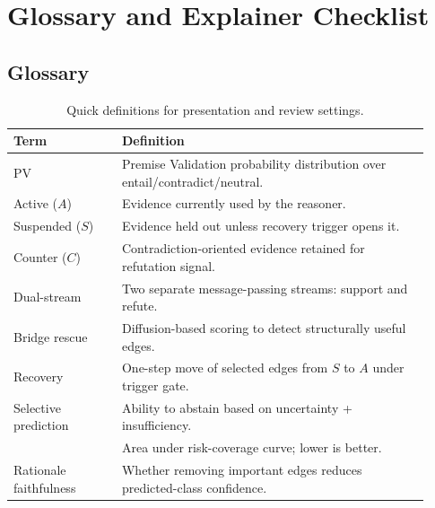 \section{Glossary and Explainer Checklist}
\label{sec:glossary}

\subsection{Glossary}
\begin{table}[H]
\centering
\begin{tabular}{@{}p{0.24\linewidth}p{0.68\linewidth}@{}}
\toprule
Term & Definition \\
\midrule
PV & Premise Validation probability distribution over entail/contradict/neutral. \\
Active ($A$) & Evidence currently used by the reasoner. \\
Suspended ($S$) & Evidence held out unless recovery trigger opens it. \\
Counter ($C$) & Contradiction-oriented evidence retained for refutation signal. \\
Dual-stream & Two separate message-passing streams: support and refute. \\
Bridge rescue & Diffusion-based scoring to detect structurally useful edges. \\
Recovery & One-step move of selected edges from $S$ to $A$ under trigger gate. \\
Selective prediction & Ability to abstain based on uncertainty + insufficiency. \\
\AURC{} & Area under risk-coverage curve; lower is better. \\
Rationale faithfulness & Whether removing important edges reduces predicted-class confidence. \\
\bottomrule
\end{tabular}
\caption{Quick definitions for presentation and review settings.}
\end{table}

